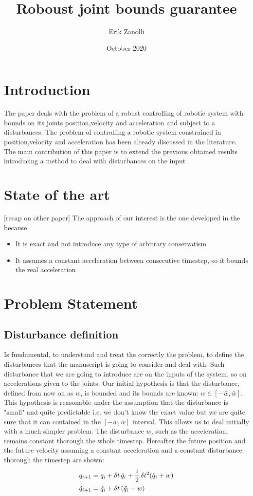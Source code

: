 \documentclass{article}
\title{Roboust joint bounds guarantee}
\author{Erik Zanolli}
\date{October 2020}
\begin{document}
\maketitle
\section{Introduction}
The paper deals with the problem of a robust controlling of robotic system with bounds on its joints position,velocity and acceleration and subject to a disturbances. The problem of controlling a robotic system constrained in position,velocity and acceleration has been already discussed in the literature. The main contribution of this paper is to extend the previous obtained results introducing a method to deal with disturbances on the input
\section{State of the art}
[recap on other paper]
The approach of our interest is the one developed in the \cite{DelPrete2018} because
\begin{itemize}
    \item It is exact and not introduce any type of arbitrary conservatism
    \item It assumes a constant acceleration between consecutive timestep, so it bounds the real acceleration
\end{itemize}
\section{Problem Statement}
\subsection{Disturbance definition}
Is fundamental, to understand and treat the correctly the problem, to define the disturbances that the manuscript is going to consider and deal with. Such disturbance that we are going to introduce are on the inputs of the system, so on accelerations given to the joints. Our initial hypothesis is that the disturbance, defined from now on as $w$, is bounded and its bounds are known: $w \in [-\bar{w},\bar{w}]$. This hypothesis is reasonable under the assumption that the disturbance is "small" and quite predictable i.e. we don't know the exact value but we are quite sure that it can contained in the $[-\bar{w},\bar{w}]$ interval. This allows us to deal initially with a much simpler problem. The disturbance $w$, such as the acceleration, remains constant thorough the whole timestep. Hereafter the future position and the future velocity assuming a constant acceleration and a constant disturbance thorough the timestep are shown:
\begin{equation} \label{eq:simple_law} \begin{aligned} 
    q_{i+1} &= q_i + \delta t \, \dot{q}_i + \operatorname*{\frac{1}{2}} \delta t^2 (\ddot{q}_i+w) \\
    \dot{q}_{i+1} &= \dot{q}_i + \delta t \, (\ddot{q}_i+w)
    \end{aligned} 
\end{equation}%
\end{document}
